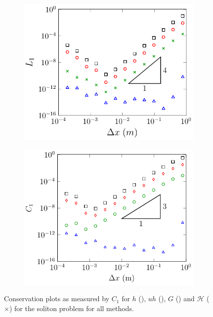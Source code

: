 \begin{figure}
\begin{subfigure}{0.5\textwidth}
		\includegraphics[width=\textwidth]{./chp5/figures/Analytic/Soliton/C1/D.pdf}
		\vspace{0.3cm}
	\end{subfigure}%
	\begin{subfigure}{0.5\textwidth}
		\includegraphics[width=\textwidth]{./chp5/figures/Analytic/Soliton/C1/W.pdf}
		\vspace{0.3cm}
	\end{subfigure}
	\caption{Conservation plots as measured by $C_1$ for $h$ (), $uh$ (), $G$ () and $\mathcal{H}$ ({\color{green!60!black} $\times$}) for the soliton problem for all methods.}
	\label{fig:SolitonC1All}
\end{figure}


